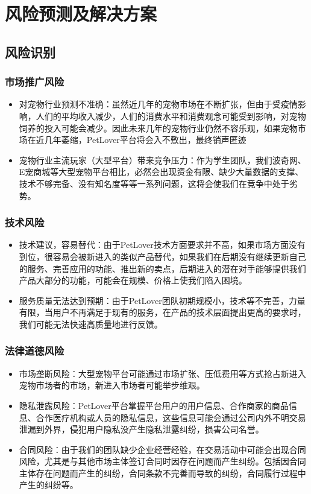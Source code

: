 \documentclass[a4paper]{ctexart}
\begin{document}
\section{风险预测及解决方案}

\subsection{风险识别}

\subsubsection{市场推广风险}
\begin{itemize}
  \item 对宠物行业预测不准确：虽然近几年的宠物市场在不断扩张，但由于受疫情影响，人们的平均收入减少，人们的消费水平和消费观念可能受到影响，对宠物饲养的投入可能会减少。因此未来几年的宠物行业仍然不容乐观，如果宠物市场在近几年萎缩，PetLover平台将会入不敷出，最终销声匿迹
  \item 宠物行业主流玩家（大型平台）带来竞争压力：作为学生团队，我们波奇网、E宠商城等大型宠物平台相比，必然会出现资金有限、缺少大量数据的支撑、技术不够完备、没有知名度等等一系列问题，这将会使我们在竞争中处于劣势。
\end{itemize}
\subsubsection{技术风险}
\begin{itemize}
  \item 技术建议，容易替代：由于PetLover技术方面要求并不高，如果市场方面没有到位，很容易会被新进入的类似产品替代，如果我们在后期没有继续更新自己的服务、完善应用的功能、推出新的卖点，后期进入的潜在对手能够提供我们产品大部分的功能，可能会在规模、价格上使我们陷入困境。
  \item 服务质量无法达到预期：由于PetLover团队初期规模小，技术等不完善，力量有限，当用户不再满足于现有的服务，在产品的技术层面提出更高的要求时，我们可能无法快速高质量地进行反馈。
\end{itemize}
\subsubsection{法律道德风险}
\begin{itemize}
  \item 市场垄断风险：大型宠物平台可能通过市场扩张、压低费用等方式抢占新进入宠物市场者的市场，新进入市场者可能举步维艰。
  \item 隐私泄露风险：PetLover平台掌握平台用户的用户信息、合作商家的商品信息、合作医疗机构或人员的隐私信息，这些信息可能会通过公司内外不明交易泄漏到外界，侵犯用户隐私没产生隐私泄露纠纷，损害公司名誉。
  \item 合同风险：由于我们的团队缺少企业经营经验，在交易活动中可能会出现合同风险，尤其是与其他市场主体签订合同时因存在问题而产生纠纷。包括因合同主体存在问题而产生的纠纷，合同条款不完善而导致的纠纷，合同履行过程中产生的纠纷等。
\end{itemize}
\end{document}
